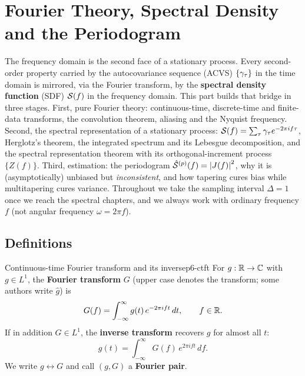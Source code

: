 \section{Fourier Theory, Spectral Density and the Periodogram}
\label{sec:spectral}

The frequency domain is the second face of a stationary process. Every
second-order property carried by the autocovariance sequence (ACVS)
$\{\gamma_\tau\}$ in the time domain is mirrored, via the Fourier transform, by
the \textbf{spectral density function} (SDF) $\mathcal{S}(f)$ in the frequency domain.
This part builds that bridge in three stages. First, pure Fourier theory:
continuous-time, discrete-time and finite-data transforms, the convolution
theorem, aliasing and the Nyquist frequency. Second, the spectral
representation of a stationary process: $\mathcal{S}(f)=\sum_\tau\gamma_\tau
e^{-2\pi i f\tau}$, Herglotz's theorem, the integrated spectrum and its
Lebesgue decomposition, and the spectral representation theorem with its
orthogonal-increment process $\{Z(f)\}$. Third, estimation: the periodogram
$\hat{\mathcal{S}}^{(p)}(f)=\left\lvert J(f) \right\rvert^2$, why it is (asymptotically) unbiased but
\emph{inconsistent}, and how tapering cures bias while multitapering cures
variance. Throughout we take the sampling interval $\Delta=1$ once we reach
the spectral chapters, and we always work with ordinary frequency $f$ (not
angular frequency $\omega=2\pi f$).

\subsection{Definitions}

\begin{definition}{Continuous-time Fourier transform and its inverse}{p6-ctft}
For $g:\mathbb{R}\to\mathbb{C}$ with $g\in L^1$, the \textbf{Fourier transform}
$G$ (upper case denotes the transform; some authors write $\hat g$) is
\[
G(f)=\int_{-\infty}^{\infty} g(t)\,e^{-2\pi i f t}\,dt,\qquad f\in\mathbb{R} .
\]
If in addition $G\in L^1$, the \textbf{inverse transform} recovers $g$ for
almost all $t$:
\[
g(t)=\int_{-\infty}^{\infty} G(f)\,e^{2\pi i f t}\,df .
\]
We write $g\longleftrightarrow G$ and call $(g,G)$ a \textbf{Fourier pair}.
\end{definition}


